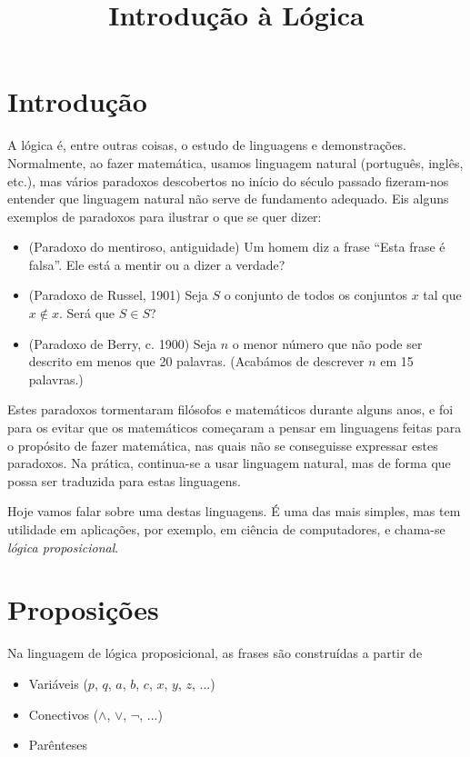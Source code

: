 \documentclass{article}
\title{Introdução à Lógica}
\author{}
\date{}
\theoremstyle{definition}
\theoremstyle{remark}
\begin{document}
	\maketitle

	\section{Introdução}

	A lógica é, entre outras coisas, o estudo de linguagens e demonstrações. Normalmente, ao fazer matemática, usamos linguagem natural (português, inglês, etc.), mas vários paradoxos descobertos no início do século passado fizeram-nos entender que linguagem natural não serve de fundamento adequado. Eis alguns exemplos de paradoxos para ilustrar o que se quer dizer:
	
	\begin{itemize}
	\item (Paradoxo do mentiroso, antiguidade) Um homem diz a frase ``Esta frase é falsa''. Ele está a mentir ou a dizer a verdade?
	
	\item (Paradoxo de Russel, 1901) Seja $S$ o conjunto de todos os conjuntos $x$ tal que $x \not \in x$. Será que $S \in S$?
	
	\item (Paradoxo de Berry, c. 1900) Seja $n$ o menor número que não pode ser descrito em menos que 20 palavras. (Acabámos de descrever $n$ em 15 palavras.)
	\end{itemize}
	
	Estes paradoxos tormentaram filósofos e matemáticos durante alguns anos, e foi para os evitar que os matemáticos começaram a pensar em linguagens feitas para o propósito de fazer matemática, nas quais não se conseguisse expressar estes paradoxos. Na prática, continua-se a usar linguagem natural, mas de forma que possa ser traduzida para estas linguagens.
	
	Hoje vamos falar sobre uma destas linguagens. É uma das mais simples, mas tem utilidade em aplicações, por exemplo, em ciência de computadores, e chama-se \textit{lógica proposicional}.
	
	\section{Proposições}
	
	Na linguagem de lógica proposicional, as frases são construídas a partir de
	
	\begin{itemize}
	\item Variáveis ($p$, $q$, $a$, $b$, $c$, $x$, $y$, $z$, ...)
	
	\item Conectivos ($\land$, $\lor$, $\neg$, ...)
	
	\item Parênteses
	\end{itemize}
	
\end{document}
